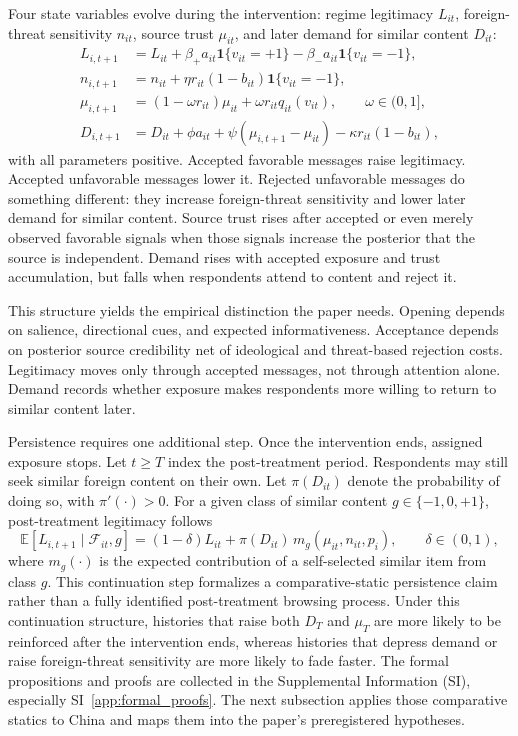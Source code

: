 \documentclass[12pt,american]{article}
\begin{document}
	Four state variables evolve during the intervention: regime legitimacy \(L_{it}\), foreign-threat sensitivity \(n_{it}\), source trust \(\mu_{it}\), and later demand for similar content \(D_{it}\):
	\begin{align*}
		L_{i,t+1}&=L_{it}+\beta_{+}a_{it}\mathbf{1}\{v_{it}=+1\}-\beta_{-}a_{it}\mathbf{1}\{v_{it}=-1\},\\
		n_{i,t+1}&=n_{it}+\eta r_{it}(1-b_{it})\mathbf{1}\{v_{it}=-1\},\\
		\mu_{i,t+1}&=(1-\omega r_{it})\mu_{it}+\omega r_{it}q_{it}(v_{it}), \qquad \omega\in(0,1],\\
		D_{i,t+1}&=D_{it}+\phi a_{it}+\psi(\mu_{i,t+1}-\mu_{it})-\kappa r_{it}(1-b_{it}),
	\end{align*}
	with all parameters positive. Accepted favorable messages raise legitimacy. Accepted unfavorable messages lower it. Rejected unfavorable messages do something different: they increase foreign-threat sensitivity and lower later demand for similar content. Source trust rises after accepted or even merely observed favorable signals when those signals increase the posterior that the source is independent. Demand rises with accepted exposure and trust accumulation, but falls when respondents attend to content and reject it.
	
	This structure yields the empirical distinction the paper needs. Opening depends on salience, directional cues, and expected informativeness. Acceptance depends on posterior source credibility net of ideological and threat-based rejection costs. Legitimacy moves only through accepted messages, not through attention alone. Demand records whether exposure makes respondents more willing to return to similar content later.
	
	Persistence requires one additional step. Once the intervention ends, assigned exposure stops. Let \(t\ge T\) index the post-treatment period. Respondents may still seek similar foreign content on their own. Let \(\pi(D_{it})\) denote the probability of doing so, with \(\pi'(\cdot)>0\). For a given class of similar content \(g\in\{-1,0,+1\}\), post-treatment legitimacy follows
	\[
	\mathbb{E}[L_{i,t+1}\mid \mathcal F_{it},g]=(1-\delta)L_{it}+\pi(D_{it})\,m_g(\mu_{it},n_{it},p_i),
	\qquad \delta\in(0,1),
	\]
	where \(m_g(\cdot)\) is the expected contribution of a self-selected similar item from class \(g\). This continuation step formalizes a comparative-static persistence claim rather than a fully identified post-treatment browsing process. Under this continuation structure, histories that raise both \(D_T\) and \(\mu_T\) are more likely to be reinforced after the intervention ends, whereas histories that depress demand or raise foreign-threat sensitivity are more likely to fade faster. The formal propositions and proofs are collected in the Supplemental Information (SI), especially SI~\ref{app:formal_proofs}. The next subsection applies those comparative statics to China and maps them into the paper's preregistered hypotheses.
	
\end{document}
